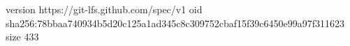 version https://git-lfs.github.com/spec/v1
oid sha256:78bbaa740934b5d20c125a1ad345c8c309752cbaf15f39c6450e99a97f311623
size 433
